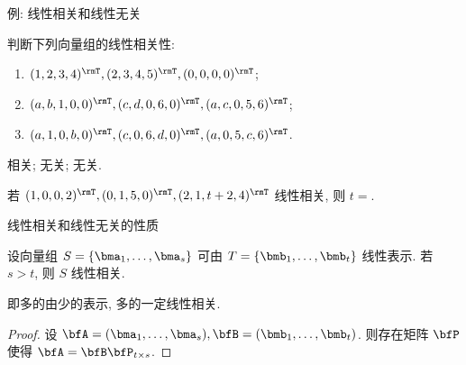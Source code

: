 \begin{frame}{例: 线性相关和线性无关}
	\onslide<+->
	\begin{example}
		判断下列向量组的线性相关性:
		\begin{enumerate}
			\item $(1,2,3,4)^\rmT,(2,3,4,5)^\rmT,(0,0,0,0)^\rmT$; 
			\item $(a,b,1,0,0)^\rmT,(c,d,0,6,0)^\rmT,(a,c,0,5,6)^\rmT$;
			\item $(a,1,0,b,0)^\rmT,(c,0,6,d,0)^\rmT,(a,0,5,c,6)^\rmT$.
		\end{enumerate}
	\end{example}
	\onslide<+->
	\begin{solution}
		相关; 无关; 无关.
	\end{solution}
	\onslide<+->
	\begin{exercise}
		若 $(1,0,0,2)^\rmT,(0,1,5,0)^\rmT,(2,1,t+2,4)^\rmT$ 线性相关, 则 $t=$.
	\end{exercise}
\end{frame}


\begin{frame}{线性相关和线性无关的性质}
	\onslide<+->
	\begin{theorem}
		设向量组 $S=\{\bma_1,\dots,\bma_s\}$ 可由 $T=\{\bmb_1,\dots,\bmb_t\}$ 线性表示. 
		若 $s>t$, 则 $S$ 线性相关.
	\end{theorem}
	\onslide<+->
	即\alert{多的由少的表示, 多的一定线性相关}.
	\onslide<+->
	\begin{proof}
		设 $\bfA=(\bma_1,\dots,\bma_s),\bfB=(\bmb_1,\dots,\bmb_t)$.
		则存在矩阵 $\bfP$ 使得 $\bfA=\bfB\bfP_{t\times s}$.
		\onslide<+->{%
			从而 $\bfP\bfx={\bf0},\bfA\bfx=\bfB\bfP\bfx={\bf0}$, $S$ 线性相关.\qedhere
		}
	\end{proof}
\end{frame}


